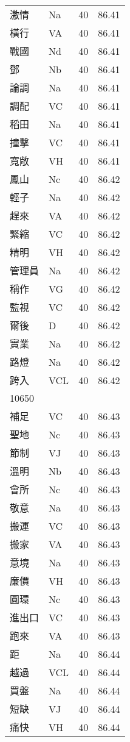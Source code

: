 \documentclass[twocolumn]{book}
\begin{document}
\begin{supertabular}{llrr}
激情 & Na & 40 &  86.41\\
橫行 & VA & 40 &  86.41\\
戰國 & Nd & 40 &  86.41\\
鄧 & Nb & 40 &  86.41\\
論調 & Na & 40 &  86.41\\
調配 & VC & 40 &  86.41\\
稻田 & Na & 40 &  86.41\\
撞擊 & VC & 40 &  86.41\\
寬敞 & VH & 40 &  86.41\\
鳳山 & Nc & 40 &  86.42\\
輕子 & Na & 40 &  86.42\\
趕來 & VA & 40 &  86.42\\
緊縮 & VC & 40 &  86.42\\
精明 & VH & 40 &  86.42\\
管理員 & Na & 40 &  86.42\\
稱作 & VG & 40 &  86.42\\
監視 & VC & 40 &  86.42\\
爾後 & D & 40 &  86.42\\
實業 & Na & 40 &  86.42\\
路燈 & Na & 40 &  86.42\\
跨入 & VCL & 40 &  86.42\\
10650\\
補足 & VC & 40 &  86.43\\
聖地 & Nc & 40 &  86.43\\
節制 & VJ & 40 &  86.43\\
溫明 & Nb & 40 &  86.43\\
會所 & Nc & 40 &  86.43\\
敬意 & Na & 40 &  86.43\\
搬運 & VC & 40 &  86.43\\
搬家 & VA & 40 &  86.43\\
意境 & Na & 40 &  86.43\\
廉價 & VH & 40 &  86.43\\
圓環 & Nc & 40 &  86.43\\
進出口 & VC & 40 &  86.43\\
跑來 & VA & 40 &  86.43\\
距 & Na & 40 &  86.44\\
越過 & VCL & 40 &  86.44\\
買盤 & Na & 40 &  86.44\\
短缺 & VJ & 40 &  86.44\\
痛快 & VH & 40 &  86.44\\

\end{supertabular}
\end{document}
